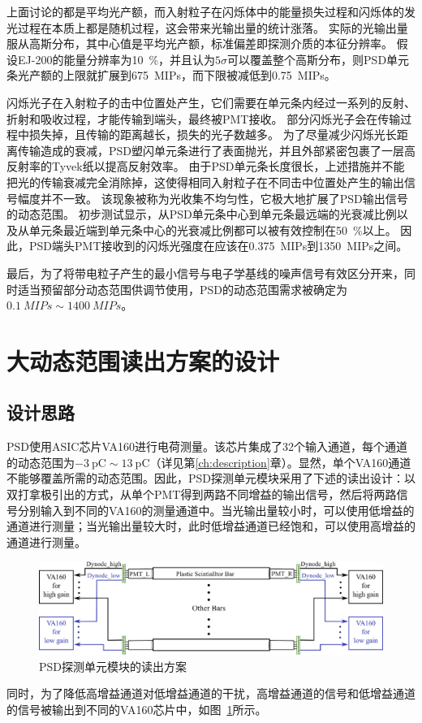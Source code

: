 上面讨论的都是平均光产额，而入射粒子在闪烁体中的能量损失过程和闪烁体的发光过程在本质上都是随机过程，这会带来光输出量的统计涨落。
实际的光输出量服从高斯分布，其中心值是平均光产额，标准偏差即探测介质的本征分辨率。
假设EJ-200的能量分辨率为\SI{10}{\percent}，并且认为$5\sigma$可以覆盖整个高斯分布，则PSD单元条光产额的上限就扩展到\SI{675}{MIPs}，而下限被减低到\SI{0.75}{MIPs}。

闪烁光子在入射粒子的击中位置处产生，它们需要在单元条内经过一系列的反射、折射和吸收过程，才能传输到端头，最终被PMT接收。
部分闪烁光子会在传输过程中损失掉，且传输的距离越长，损失的光子数越多。
为了尽量减少闪烁光长距离传输造成的衰减，PSD塑闪单元条进行了表面抛光，并且外部紧密包裹了一层高反射率的Tyvek纸以提高反射效率。
由于PSD单元条长度很长，上述措施并不能把光的传输衰减完全消除掉，这使得相同入射粒子在不同击中位置处产生的输出信号幅度并不一致。
该现象被称为光收集不均匀性，它极大地扩展了PSD输出信号的动态范围。
初步测试显示，从PSD单元条中心到单元条最远端的光衰减比例以及从单元条最近端到单元条中心的光衰减比例都可以被有效控制在\SI{50}{\percent}以上。
因此，PSD端头PMT接收到的闪烁光强度在应该在\SI{0.375}{MIPs}到\SI{1350}{MIPs}之间。

最后，为了将带电粒子产生的最小信号与电子学基线的噪声信号有效区分开来，同时适当预留部分动态范围供调节使用，PSD的动态范围需求被确定为$\SI{0.1}{MIPs}\sim\SI{1400}{MIPs}$。

\section{大动态范围读出方案的设计}
\label{sec:dynamic_range:design}

\subsection{设计思路}
\label{sec:dynamic_range:readout_scheme}
PSD使用ASIC芯片VA160进行电荷测量。该芯片集成了32个输入通道，每个通道的动态范围为$\SI{-3}{\pico\coulomb}\sim\SI{13}{\pico\coulomb}$（详见第\ref{ch:description}章）。显然，单个VA160通道不能够覆盖所需的动态范围。因此，PSD探测单元模块采用了下述的读出设计：以双打拿极引出的方式，从单个PMT得到两路不同增益的输出信号，然后将两路信号分别输入到不同的VA160的测量通道中。当光输出量较小时，可以使用低增益的通道进行测量；当光输出量较大时，此时低增益通道已经饱和，可以使用高增益的通道进行测量。
\begin{figure}[htb]
	\centering
	\includegraphics[width=\textwidth]{chap/dynamic_range/fig/readout_scheme.eps}
	\caption{PSD探测单元模块的读出方案}
	\label{fig:dynamic_range:readout_scheme}
\end{figure}
同时，为了降低高增益通道对低增益通道的干扰，高增益通道的信号和低增益通道的信号被输出到不同的VA160芯片中，如图~\ref{fig:dynamic_range:readout_scheme}所示。

